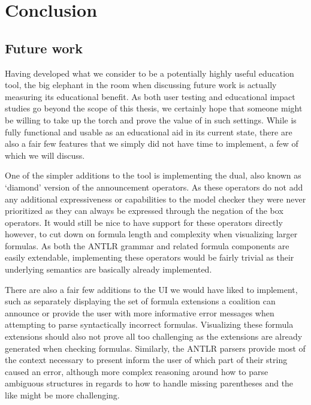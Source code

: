 \section{Conclusion}\label{sec:impl}

\subsection{Future work}




Having developed what we consider to be a potentially highly useful education tool, the big elephant in the room when discussing future work is actually measuring its educational benefit. As both user testing and educational impact studies go beyond the scope of this thesis, we certainly hope that someone might be willing to take up the torch and prove the value of \cname{} in such settings. While \cname{} is fully functional and usable as an educational aid in its current state, there are also a fair few features that we simply did not have time to implement, a few of which we will discuss.

One of the simpler additions to the tool is implementing the dual, also known as `diamond' version of the announcement operators. As these operators do not add any additional expressiveness or capabilities to the model checker they were never prioritized as they can always be expressed through the negation of the box operators. It would still be nice to have support for these operators directly however, to cut down on formula length and complexity when visualizing larger formulas. As both the ANTLR grammar and related formula components are easily extendable, implementing these operators would be fairly trivial as their underlying semantics are basically already implemented.

There are also a fair few additions to the UI we would have liked to implement, such as separately displaying the set of formula extensions a coalition can announce or provide the user with more informative error messages when attempting to parse syntactically incorrect formulas. Visualizing these formula extensions should also not prove all too challenging as the extensions are already generated when checking formulas. Similarly, the ANTLR parsers provide most of the context necessary to present inform the user of which part of their string caused an error, although more complex reasoning around how to parse ambiguous structures in regards to how to handle missing parentheses and the like might be more challenging. 

